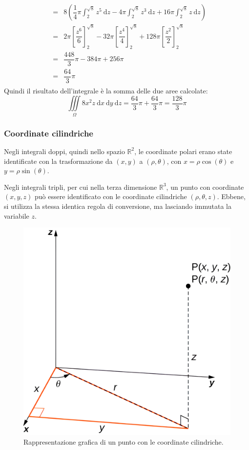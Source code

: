 \documentclass[a4paper]{article}
\begin{document}
\begin{gather*}
\begin{array}{rcl}
			&=&
			8\left(\dfrac{1}{4}\pi\displaystyle\int_{2}^{\sqrt{8}} z^{5} \:\mathrm{d}z - 4\pi\int_{2}^{\sqrt{8}} z^{3} \:\mathrm{d}z + 16\pi\int_{2}^{\sqrt{8}} z \:\mathrm{d}z\right) \\ [1.5em]
			&=&
			2\pi\left[\dfrac{z^{6}}{6}\right]_{2}^{\sqrt{8}} - 32\pi\left[\dfrac{z^{4}}{4}\right]_{2}^{\sqrt{8}} + 128\pi\left[\dfrac{z^{2}}{2}\right]_{2}^{\sqrt{8}} \\ [1.5em]
			&=&
			\dfrac{448}{3}\pi - 384\pi + 256\pi \\ [1em]
			&=&
			\dfrac{64}{3}\pi
		\end{array}
	\end{gather*}
	Quindi il risultato dell'integrale è la somma delle due aree calcolate:
	\begin{equation*}
		\displaystyle\iiint\limits_{\Omega} 8x^{2}z \:\mathrm{d}x\:\mathrm{d}y\:\mathrm{d}z = \dfrac{64}{3}\pi + \dfrac{64}{3}\pi = \dfrac{128}{3}\pi
	\end{equation*}\newpage

	\subsubsection{Coordinate cilindriche}\label{subsubsection: coordinate cilindriche}

	Negli integrali doppi, quindi nello spazio $\mathbb{R}^{2}$, le coordinate polari erano state identificate con la trasformazione da $\left(x,y\right)$ a $\left(\rho, \theta\right)$, con $x = \rho\cos\left(\theta\right)$ e $y = \rho\sin\left(\theta\right)$.\newline

	\noindent
	Negli integrali tripli, per cui nella terza dimensione $\mathbb{R}^{3}$, un punto con coordinate $\left(x,y,z\right)$ può essere identificato con le coordinate cilindriche $\left(\rho, \theta, z\right)$. Ebbene, si utilizza la stessa identica regola di conversione, ma lasciando immutata la variabile $z$.
	\begin{figure}[!htp]
		\centering
		\includegraphics[width=.5\textwidth]{img/integrali_tripli-coordinate_cilindriche.png}
		\caption{Rappresentazione grafica di un punto con le coordinate cilindriche.}
	\end{figure}
\end{document}
